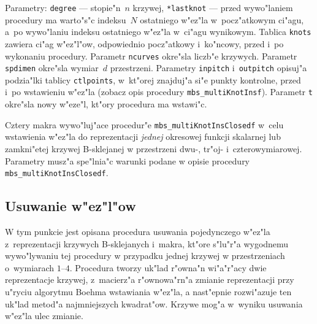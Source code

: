 Parametry: \texttt{degree} --- stopie"n~$n$ krzywej, \texttt{*lastknot} --- przed
wywo"laniem procedury ma warto"s"c indeksu~$N$ ostatniego w"ez"la
w~pocz"atkowym ci"agu, a~po wywo"laniu indeksu ostatniego w"ez"la w~ci"agu
wynikowym. Tablica \texttt{knots} zawiera ci"ag w"ez"l"ow, odpowiednio
pocz"atkowy i~ko"ncowy, przed i~po wykonaniu procedury. Parametr
\texttt{ncurves} okre"sla liczb"e krzywych. Parametr \texttt{spdimen}
okre"sla wymiar~$d$ przestrzeni. Parametry \texttt{inpitch} i~\texttt{outpitch}
opisuj"a podzia"lki tablicy \texttt{ctlpoints}, w~kt"orej znajduj"a si"e
punkty kontrolne, przed i~po wstawieniu w"ez"la (zobacz opis procedury
\texttt{mbs\_multiKnotInsf}). Parametr \texttt{t} okre"sla nowy w"eze"l,
kt"ory procedura ma wstawi"c.

\vspace{\bigskipamount}
Cztery makra wywo"luj"ace procedur"e \texttt{mbs\_multiKnotInsClosedf} w~celu
wstawienia w"ez"la do reprezentacji \emph{jednej} okresowej funkcji
skalarnej lub zamkni"etej krzywej B-sklejanej w przestrzeni dwu-,
tr"oj- i~czterowymiarowej.
Parametry musz"a spe"lnia"c warunki podane w opisie procedury
\texttt{mbs\_multiKnotInsClosedf}.



\subsection{Usuwanie w"ez"l"ow}

W tym punkcie jest opisana procedura usuwania pojedynczego w"ez"la
z~reprezentacji krzywych B-sklejanych i~makra, kt"ore s"lu"r"a wygodnemu
wywo"lywaniu tej procedury w przypadku jednej krzywej w przestrzeniach
o~wymiarach $1$--$4$. Procedura tworzy uk"lad r"owna"n wi"a"r"acy dwie
reprezentacje krzywej, z~macierz"a r"ownowa"rn"a zmianie reprezentacji przy
u"ryciu algorytmu Boehma wstawiania w"ez"la, a nast"epnie rozwi"azuje ten
uk"lad metod"a najmniejszych kwadrat"ow. Krzywe mog"a w~wyniku usuwania
w"ez"la ulec zmianie.

